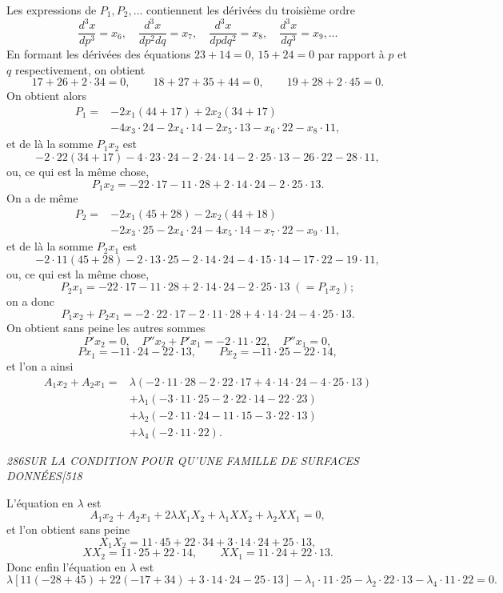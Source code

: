 \documentclass[11pt]{article}
\newcommand{\phead}[3]{\noindent\textit{#1\hfill #2\hfill #3}\par\medskip}
\begin{document}
Les expressions de $P_1,P_2,\ldots$ contiennent les d\'eriv\'ees du troisi\`eme ordre
\[
\frac{d^3x}{dp^3}=x_6,\quad \frac{d^3x}{dp^2dq}=x_7,\quad
\frac{d^3x}{dpdq^2}=x_8,\quad \frac{d^3x}{dq^3}=x_9,\ldots
\]
En formant les d\'eriv\'ees des \'equations $23+14=0$, $15+24=0$ par rapport \`a
$p$ et $q$ respectivement, on obtient
\[
17+26+2\cdot34=0,\qquad
18+27+35+44=0,\qquad
19+28+2\cdot45=0.
\]
On obtient alors
\[
\begin{split}
P_1={}&-2x_1(44+17)+2x_2(34+17)\\
&-4x_3\cdot24-2x_4\cdot14-2x_5\cdot13-x_6\cdot22-x_8\cdot11,
\end{split}
\]
et de l\`a la somme $P_1x_2$ est
\[
-2\cdot22(34+17)-4\cdot23\cdot24-2\cdot24\cdot14-2\cdot25\cdot13-26\cdot22-28\cdot11,
\]
ou, ce qui est la m\^eme chose,
\[
P_1x_2=-22\cdot17-11\cdot28+2\cdot14\cdot24-2\cdot25\cdot13.
\]
On a de m\^eme
\[
\begin{split}
P_2={}&-2x_1(45+28)-2x_2(44+18)\\
&-2x_3\cdot25-2x_4\cdot24-4x_5\cdot14-x_7\cdot22-x_9\cdot11,
\end{split}
\]
et de l\`a la somme $P_2x_1$ est
\[
-2\cdot11(45+28)-2\cdot13\cdot25-2\cdot14\cdot24-4\cdot15\cdot14-17\cdot22-19\cdot11,
\]
ou, ce qui est la m\^eme chose,
\[
P_2x_1=-22\cdot17-11\cdot28+2\cdot14\cdot24-2\cdot25\cdot13\;(=P_1x_2);
\]
on a donc
\[
P_1x_2+P_2x_1=-2\cdot22\cdot17-2\cdot11\cdot28+4\cdot14\cdot24-4\cdot25\cdot13.
\]
On obtient sans peine les autres sommes
\[
P'x_2=0,\quad P''x_2+P'x_1=-2\cdot11\cdot22,\quad P''x_1=0,
\]
\[
Px_1=-11\cdot24-22\cdot13,\qquad Px_2=-11\cdot25-22\cdot14,
\]
et l'on a ainsi
\[
\begin{split}
A_1x_2+A_2x_1={}&\lambda(-2\cdot11\cdot28-2\cdot22\cdot17+4\cdot14\cdot24-4\cdot25\cdot13)\\
&+\lambda_1(-3\cdot11\cdot25-2\cdot22\cdot14-22\cdot23)\\
&+\lambda_2(-2\cdot11\cdot24-11\cdot15-3\cdot22\cdot13)\\
&+\lambda_4(-2\cdot11\cdot22).
\end{split}
\]

\clearpage

\phead{286}{SUR LA CONDITION POUR QU'UNE FAMILLE DE SURFACES DONN\'EES}{[518}

L'\'equation en $\lambda$ est
\[
A_1x_2+A_2x_1+2\lambda X_1X_2+\lambda_1XX_2+\lambda_2XX_1=0,
\]
et l'on obtient sans peine
\[
X_1X_2=11\cdot45+22\cdot34+3\cdot14\cdot24+25\cdot13,
\]
\[
XX_2=11\cdot25+22\cdot14,\qquad XX_1=11\cdot24+22\cdot13.
\]
Donc enfin l'\'equation en $\lambda$ est
\[
\lambda[11(-28+45)+22(-17+34)+3\cdot14\cdot24-25\cdot13]
-\lambda_1\cdot11\cdot25-\lambda_2\cdot22\cdot13-\lambda_4\cdot11\cdot22=0.
\]
\end{document}
